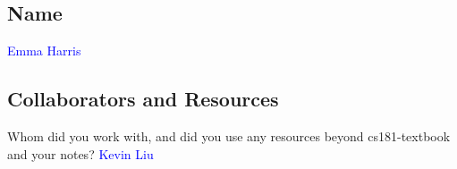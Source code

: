 \documentclass[submit]{../harvardml}
\begin{document}
\clearpage
\subsection*{Name}
\textcolor{blue}{Emma Harris}

\subsection*{Collaborators and Resources}
Whom did you work with, and did you use any resources beyond cs181-textbook and your notes?
\textcolor{blue}{Kevin Liu}
\end{document}

